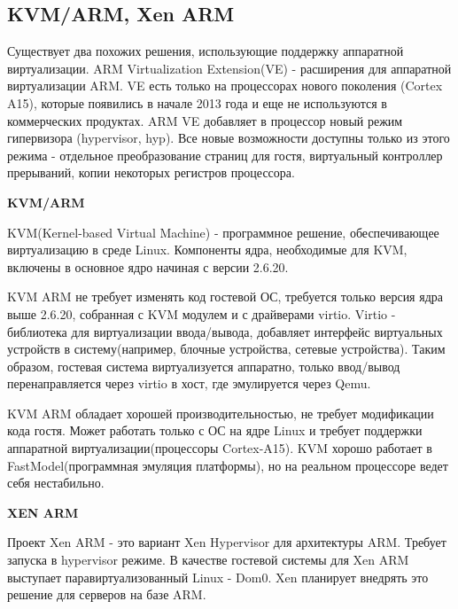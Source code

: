 \subsection{KVM/ARM, Xen ARM}
Существует два похожих решения, использующие поддержку аппаратной виртуализации. ARM Virtualization Extension(VE) - расширения для аппаратной виртуализации ARM. VE есть только на процессорах нового поколения (Cortex A15), которые появились в начале 2013 года и еще не используются в коммерческих продуктах. ARM VE добавляет в процессор новый режим гипервизора (hypervisor, hyp). Все новые возможности доступны только из этого режима - отдельное преобразование страниц для гостя, виртуальный контроллер прерываний, копии некоторых регистров процессора.

\textbf{KVM/ARM} 

KVM(Kernel-based Virtual Machine)\cite{bib:kvm} - программное решение, обеспечивающее виртуализацию  в среде Linux. Компоненты ядра, необходимые для KVM, включены в основное ядро начиная с версии 2.6.20.


KVM ARM\cite{bib:kvm_arm} не требует изменять код гостевой ОС, требуется только версия ядра выше 2.6.20, собранная с KVM модулем и с драйверами virtio. Virtio - библиотека для виртуализации ввода/вывода, добавляет интерфейс виртуальных устройств в систему(например, блочные устройства, сетевые устройства). Таким образом, гостевая система виртуализуется аппаратно, только ввод/вывод перенаправляется через virtio в хост, где эмулируется через Qemu.

KVM ARM обладает хорошей производительностью, не требует модификации кода гостя. Может работать только с ОС на ядре Linux и требует поддержки аппаратной виртуализации(процессоры Cortex-A15). KVM хорошо работает в FastModel(программная эмуляция платформы), но на реальном процессоре ведет себя нестабильно.

\textbf{XEN ARM}

Проект Xen ARM\cite{bib:xen_arm} - это вариант Xen Hypervisor для архитектуры ARM. Требует запуска в hypervisor режиме. В качестве гостевой системы для Xen ARM выступает паравиртуализованный Linux - Dom0. Xen планирует внедрять это решение для серверов на базе ARM.




